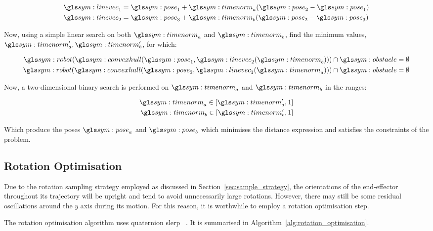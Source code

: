 		\begin{align}
			\linevec_1 &= \pose_1 + \timenorm_a(\pose_2 - \pose_1)\\
			\linevec_2 &= \pose_3 + \timenorm_b(\pose_2 - \pose_3)\\
		\end{align}

		Now, using a simple linear search on both $\timenorm_a$ and
		$\timenorm_b$, find the minimum values, $\timenorm_a',
		\timenorm_b'$, for which:

		\begin{align}
			\robot(\convexhull(\pose_1, \linevec_2(\timenorm_b))) \cap
				\obstacle = \emptyset\\
			\robot(\convexhull(\pose_3, \linevec_1(\timenorm_a))) \cap
				\obstacle = \emptyset
		\end{align}

		Now, a two-dimensional binary search is performed on $\timenorm_a$
		and $\timenorm_b$ in the ranges:

		\begin{align}
			\timenorm_a \in [\timenorm_a', 1]\\
			\timenorm_b \in [\timenorm_b', 1]
		\end{align}

		Which produce the poses $\pose_a$ and $\pose_b$ which minimises the
		distance expression and satisfies the constraints of the problem.

	\subsection{Rotation Optimisation}%
	\label{sec:rotation_optimisation}

		Due to the rotation sampling strategy employed as discussed in
		Section~\ref{sec:sample_strategy}, the orientations of the end-effector
		throughout its trajectory will be upright and tend to avoid
		unnecessarily large rotations. However, there may still be some residual
		oscillations around the $y$ axis during its motion. For this reason,
		it is worthwhile to employ a rotation optimisation step.

		The rotation optimisation algorithm uses quaternion
		\gls{slerp}~\cite{bib:math:a_compact_differential_formula_for_the_first_derivative_of_a_unit_quaternion_curve}%
		\cite{bib:math:a_general_construction_scheme_for_unit_quaternion_curves_with_simple_high_order_derivatives}.
		It is summarised in Algorithm~\ref{alg:rotation_optimisation}.

